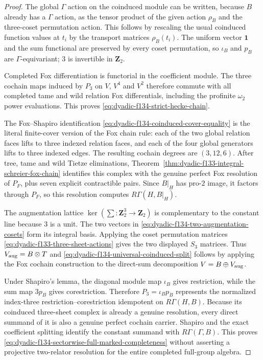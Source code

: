 \documentclass[11pt]{article}
\theoremstyle{definition}
\begin{document}
\begin{proof}
The global
$\Gamma$ action
on the coinduced
module can be
written, because
$B$ already has
a $\Gamma$ action,
as the tensor
product of the
given action
$\rho_B$ and the
three-coset
permutation action.
This follows by
rescaling the
usual coinduced
function values at
$t_i$ by the
transport matrices
$\rho_B(t_i)$.
The uniform vector
$\mathbf1$ and
the sum functional
are preserved by
every coset
permutation, so
$\iota_B$ and
$p_B$ are
$\Gamma$-equivariant;
$3$ is invertible
in $\mathbf Z_2$.

Completed Fox
differentiation
is functorial in
the coefficient
module.
The three
cochain maps
induced by
$P_3$ on $V$,
$V^4$ and $V^2$
therefore commute
with all completed
tame and wild
relation Fox
differentials,
including the
profinite $\omega_2$
power evaluations.
This proves
\eqref{eq:dyadic-f134-strict-hecke-chain}.

The Fox--Shapiro
identification
\eqref{eq:dyadic-f134-coinduced-cover-equality}
is the literal
finite-cover
version of the
Fox chain rule:
each of the
two global
relation faces
lifts to three
indexed relation
faces, and each
of the four
global generators
lifts to three
indexed edges.
The resulting
cochain degrees
are $(3,12,6)$.
After tree,
tame and wild
Tietze eliminations,
Theorem~\ref{thm:dyadic-f133-integral-schreier-fox-chain}
identifies this
complex with
the genuine
perfect Fox
resolution of
$P_F$, plus
seven explicit
contractible pairs.
Since $B|_H$
has pro-$2$ image,
it factors
through $P_F$,
so this resolution
computes
$R\Gamma(H,B|_H)$.

The augmentation
lattice
$\ker(\sum:
\mathbf Z_2^3\to\mathbf Z_2)$
is complementary
to the constant
line because
$3$ is a unit.
The two vectors
in
\eqref{eq:dyadic-f134-two-augmentation-cosets}
form its
integral basis.
Applying the
coset permutation
matrices
\eqref{eq:dyadic-f133-three-sheet-actions}
gives the two
displayed $S_3$
matrices.
Thus
$V_{\rm aug}=B\otimes T$
and
\eqref{eq:dyadic-f134-universal-coinduced-split}
follows by applying
the Fox cochain
construction to
the direct-sum
decomposition
$V=B\oplus V_{\rm aug}$.

Under Shapiro's
lemma,
the diagonal
module map
$\iota_B$ gives
restriction,
while the
sum map
$3p_B$ gives
corestriction.
Therefore
$P_3=\iota_Bp_B$
represents the
normalized
index-three
restriction--corestriction
idempotent on
$R\Gamma(H,B)$.
Because its
coinduced
three-sheet complex
is already
a genuine
resolution,
every direct
summand of it
is also a genuine
perfect cochain
carrier.
Shapiro and
the exact
coefficient
splitting identify
the constant
summand with
$R\Gamma(\Gamma,B)$.
This proves
\eqref{eq:dyadic-f134-sectorwise-full-marked-completeness}
without
asserting a
projective
two-relator
resolution for
the entire
completed
full-group
algebra.


\end{proof}
\end{document}
